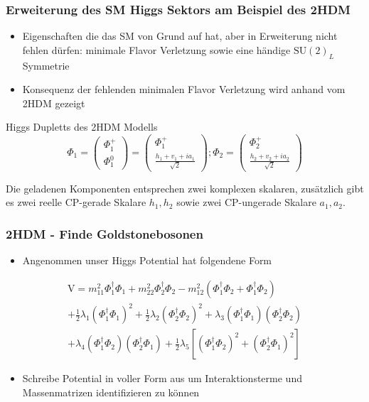 \documentclass{beamer}
\begin{document}
\begin{frame}
\frametitle{Erweiterung des SM Higgs Sektors am Beispiel des 2HDM}
\begin{itemize}
\item Eigenschaften die das SM von Grund auf hat, aber in Erweiterung nicht fehlen dürfen: minimale Flavor Verletzung sowie eine händige $\text{SU}(2)_L$ Symmetrie
\item  Konsequenz der fehlenden minimalen Flavor Verletzung wird anhand vom 2HDM gezeigt
\end{itemize}
\begin{block}{Higgs Dupletts des 2HDM Modells }
\begin{equation*}
\Phi_{1}=\left( \begin{array}{c} \Phi^{+}_{1}\\ \Phi^{0}_{1} \end{array}\right)=\left( \begin{array}{c}\Phi^{+}_{1} \\  \frac{h_{1}+v_{1}+ia_{1}}{\sqrt{2}}\end{array}\right) ; \Phi_{2}=\left( \begin{array}{c}\Phi^{+}_{2} \\  \frac{h_{2}+v_{2}+ia_{2}}{\sqrt{2}} \end{array}\right) 
\end{equation*}
\end{block}
Die geladenen Komponenten entsprechen zwei komplexen skalaren, zusätzlich gibt es zwei reelle CP-gerade Skalare $h_{1},h_{2}$ sowie zwei CP-ungerade Skalare $a_{1},a_{2}$. 
\end{frame}



\begin{frame}[t]
\frametitle{2HDM - Finde Goldstonebosonen}
\begin{itemize}
\item Angenommen unser Higgs Potential hat folgendene Form
\end{itemize}
\begin{equation*}
\begin{split}
\text{V}=m_{11}^{2} \Phi_{1}^{\dagger}\Phi_{1}+m_{22}^{2} \Phi_{2}^{\dagger}\Phi_{2} -m_{12}^{2}( \Phi_{1}^{\dagger}\Phi_{2} +\Phi_{1}^{\dagger}\Phi_{2}) \\+ \frac{1}{2} \lambda_{1} (\Phi_{1}^{\dagger}\Phi_{1})^{2}+ \frac{1}{2} \lambda_{2} (\Phi_{2}^{\dagger}\Phi_{2})^{2}+ \lambda_{3}( \Phi_{1}^{\dagger}\Phi_{1})(\Phi_{2}^{\dagger}\Phi_{2} ) \\+\lambda_{4}( \Phi_{1}^{\dagger}\Phi_{2})(\Phi_{2}^{\dagger}\Phi_{1} ) +\frac{1}{2} \lambda_{5}[( \Phi_{1}^{\dagger}\Phi_{2})^{2}+(\Phi_{2}^{\dagger}\Phi_{1} )^{2}]
\end{split}
\end{equation*}
\begin{itemize}
\item Schreibe Potential in voller Form aus um Interaktionsterme und Massenmatrizen identifizieren zu können 
\end{itemize} 
\end{frame}
\end{document}
